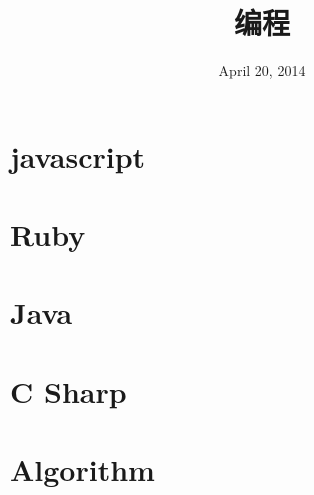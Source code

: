 \documentclass[12pt, oneside, b5paper]{book}
\title{编程}
\date{April 20, 2014}
\begin{document}
  
\begin{CJK}{UTF8}{gkai}
\maketitle

\part{javascript}






\part{Ruby}  


\part{Java}


\part{C Sharp}


\part{Algorithm}

		
\newpage
\end{CJK}  
\end{document}

